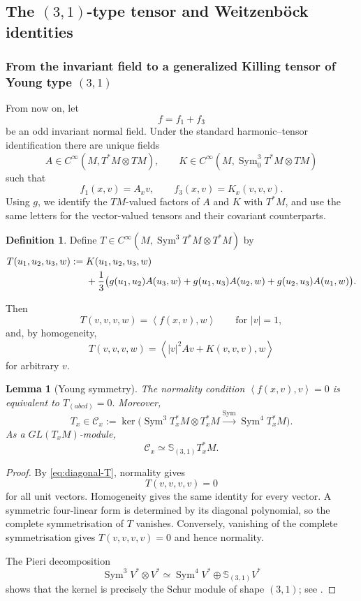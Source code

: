 \documentclass[reqno,11pt]{amsart}
\newtheorem{lemma}[theorem]{Lemma}
\theoremstyle{definition}
\newtheorem{definition}[theorem]{Definition}
\newcommand{\cC}{\mathcal C}
\newcommand{\Sym}{\operatorname{Sym}}
\newcommand{\Hook}{\mathbb S_{(3,1)}}
\newcommand{\inner}[2]{\left\langle #1,#2\right\rangle}
\begin{document}
\subsection{The \texorpdfstring{$(3,1)$}{(3,1)}-type tensor and Weitzenb\"ock identities}\label{sec:cubic}

\subsubsection{From the invariant field to a generalized Killing tensor of Young type \texorpdfstring{$(3,1)$}{(3,1)}}

From now on, let
$$
  f=f_1+f_3
$$
be an odd invariant normal field. Under the standard harmonic--tensor
identification there are unique fields
$$
  A\in C^\infty(M,T^*M\otimes TM),
  \qquad
  K\in C^\infty(M,\Sym^3_0T^*M\otimes TM)
$$
such that
$$
  f_1(x,v)=A_xv,
  \qquad
  f_3(x,v)=K_x(v,v,v).
$$
Using $g$, we identify the $TM$-valued factors of $A$ and $K$ with
$T^*M$, and use the same letters for the vector-valued tensors and
their covariant counterparts.

\begin{definition}\label{def:T}
Define $T\in C^\infty(M,\Sym^3T^*M\otimes T^*M)$ by
\begin{align}
  T(u_1,u_2,u_3,w)
  :={}&K(u_1,u_2,u_3,w)\notag\\
  &+\frac13\bigl(
      g(u_1,u_2)A(u_3,w)
     +g(u_1,u_3)A(u_2,w)
     +g(u_2,u_3)A(u_1,w)
    \bigr).
  \label{eq:Tdef}
\end{align}
\end{definition}
Then
\begin{equation}\label{eq:diagonal-T}
  T(v,v,v,w)=\inner{f(x,v)}{w}
  \qquad\text{for }|v|=1,
\end{equation}
and, by homogeneity,
$$
  T(v,v,v,w)
  =\inner{|v|^2Av+K(v,v,v)}{w}
$$
for arbitrary $v$.


\begin{lemma}[Young symmetry]\label{lem:young-symmetry}
The normality condition $\inner{f(x,v)}{v}=0$ is equivalent to
$
  T_{(abcd)}=0.
$
Moreover,
$$
  T_x\in\cC_x
  :=\ker\bigl(
    \Sym^3T_x^*M\otimes T_x^*M
    \xrightarrow{\Sym}
    \Sym^4T_x^*M
  \bigr).
$$
As a $GL(T_xM)$-module,
$$
  \cC_x\simeq\Hook T_x^*M.
$$
\end{lemma}

\begin{proof}
By \eqref{eq:diagonal-T}, normality gives
$$
  T(v,v,v,v)=0
$$
for all unit vectors. Homogeneity gives the same identity for every vector.
A symmetric four-linear form is determined by its diagonal polynomial, so the
complete symmetrisation of $T$ vanishes. Conversely, vanishing of the complete
symmetrisation gives $T(v,v,v,v)=0$ and hence normality.

The Pieri decomposition
$$
  \Sym^3V^*\otimes V^*
  \simeq \Sym^4V^*\oplus\Hook V^*
$$
shows that the kernel is precisely the Schur module of shape $(3,1)$; see
\cite[Chapter~6]{FultonHarris}.
\end{proof}
\end{document}
